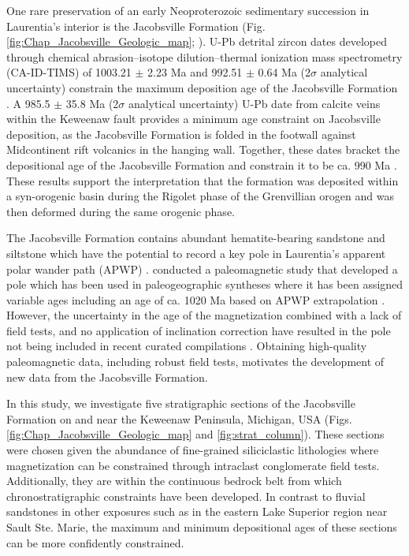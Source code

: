 One rare preservation of an early Neoproterozoic sedimentary succession in Laurentia's interior is the Jacobsville Formation (Fig. \ref{fig:Chap_Jacobsville_Geologic_map}; \citealp{Hamblin1958a, Hodgin2022a, DeGraff2022a}). U-Pb detrital zircon dates developed through chemical abrasion–isotope dilution–thermal ionization mass spectrometry (CA-ID-TIMS) of 1003.21 $\pm$ 2.23 Ma and 992.51 $\pm$ 0.64 Ma (2$\sigma$ analytical uncertainty) constrain the maximum deposition age of the Jacobsville Formation \citep{Hodgin2022a}. A 985.5 $\pm$ 35.8 Ma (2$\sigma$ analytical uncertainty) U-Pb date from calcite veins within the Keweenaw fault provides a minimum age constraint on Jacobsville deposition, as the Jacobsville Formation is folded in the footwall against Midcontinent rift volcanics in the hanging wall. Together, these dates bracket the depositional age of the Jacobsville Formation and constrain it to be ca. 990 Ma \citep{Hodgin2022a}. These results support the interpretation that the formation was deposited within a syn-orogenic basin during the Rigolet phase of the Grenvillian orogen and was then deformed during the same orogenic phase.

The Jacobsville Formation contains abundant hematite-bearing sandstone and siltstone which have the potential to record a key pole in Laurentia's apparent polar wander path (APWP) \citep{Dubois1962a, Roy1978a}. \cite{Roy1978a} conducted a paleomagnetic study that developed a pole which has been used in paleogeographic syntheses where it has been assigned variable ages including an age of ca. 1020 Ma based on APWP extrapolation \cite[e.g.][]{Li2008a}. However, the uncertainty in the age of the magnetization combined with a lack of field tests, and no application of inclination correction have resulted in the pole not being included in recent curated compilations \cite[e.g.][]{Evans2021a}. Obtaining high-quality paleomagnetic data, including robust field tests, motivates the development of new data from the Jacobsville Formation. 

In this study, we investigate five stratigraphic sections of the Jacobsville Formation on and near the Keweenaw Peninsula, Michigan, USA (Figs. \ref{fig:Chap_Jacobsville_Geologic_map} and \ref{fig:strat_column}). These sections were chosen given the abundance of fine-grained siliciclastic lithologies where magnetization can be constrained through intraclast conglomerate field tests. Additionally, they are within the continuous bedrock belt from which chronostratigraphic constraints have been developed. In contrast to fluvial sandstones in other exposures such as in the eastern Lake Superior region near Sault Ste. Marie, the maximum and minimum depositional ages of these sections can be more confidently constrained. 

